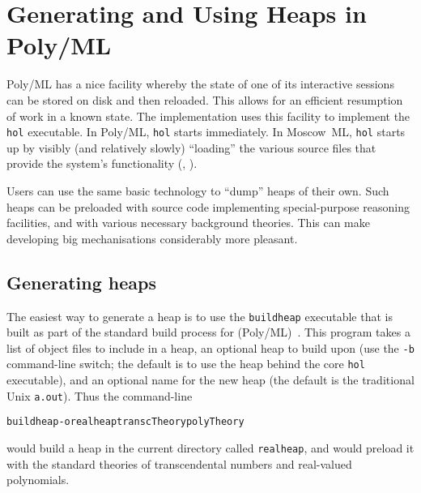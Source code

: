

\section{\texorpdfstring{Generating and Using Heaps in Poly/ML \HOL{}}{Generating and Using Heaps in Poly/ML HOL}}
\label{sec:polyml-heaps}

Poly/ML has a nice facility whereby the state of one of its interactive sessions can be stored on disk and then reloaded.
This allows for an efficient resumption of work in a known state.
The \HOL{} implementation uses this facility to implement the \texttt{hol} executable.
In Poly/ML, \texttt{hol} starts immediately.
In Moscow~ML, \texttt{hol} starts up by visibly (and relatively slowly) ``loading'' the various source files that provide the system's functionality (\eg, ).

Users can use the same basic technology to ``dump'' heaps of their own.
Such heaps can be preloaded with source code implementing special-purpose reasoning facilities, and with various necessary background theories.
This can make developing big mechanisations considerably more pleasant.

\subsection{\texorpdfstring{Generating \HOL{} heaps}{Generating HOL heaps}}

The easiest way to generate a \HOL{} heap is to use the \texttt{buildheap} executable that is built as part of the standard build process for (Poly/ML)~\HOL.
This program takes a list of object files to include in a heap, an optional heap to build upon (use the \texttt{-b} command-line switch; the default is to use the heap behind the core \texttt{hol} executable), and an optional name for the new heap (the default is the traditional Unix \texttt{a.out}).
Thus the command-line
\begin{alltt}
   buildheap -o realheap transcTheory polyTheory
\end{alltt}
would build a heap in the current directory called \texttt{realheap}, and would preload it with the standard theories of transcendental numbers and real-valued polynomials.

